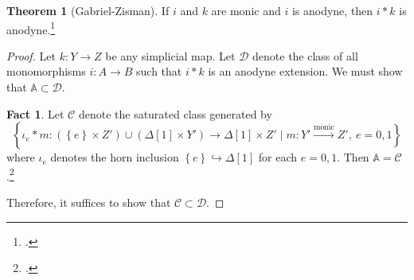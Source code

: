 \documentclass[10pt,letterpaper,cm]{nupset}
\theoremstyle{definition}
\theoremstyle{theorem}
\newtheorem{theorem}[definition]{Theorem}
\newtheorem*{fact}{Fact}
\theoremstyle{remark}
\newcommand{\D}{\mathcal D}
\newcommand{\0}{\mathbf{0}}
\newcommand{\1}{\mathbf{1}}
\newcommand{\2}{\mathbf{2}}
\begin{document}
\begin{theorem}[Gabriel-Zisman]
If $i$ and $k$ are monic and $i$ is anodyne, then $i \mathbin{\ast} k$ is anodyne.\footnote{\cite[Theorem 3.2.2]{Joyal}.}
\end{theorem}
\begin{proof}
Let $k : Y \to Z$ be any simplicial map. Let $\D$ denote the class of all monomorphisms $i: A \to B$ such that $i\mathbin{\ast}k$ is an anodyne extension. We must show that $\mathbb{A} \subset \D$.
\begin{fact}
Let $\mathcal{C}$ denote the saturated class generated by 
\[
\left\{ {\iota_e}\mathbin{\ast}{m} : \left(\left\{e\right\}\times Z'\right) \cup \left(\Delta[1] \times Y'\right) \to \Delta[1] \times Z'\mid m : Y' \xrightarrow{\text{monic}} Z', \ e=0,1   \right\}
\] where $\iota_e$ denotes the horn inclusion  $\left\{e\right\}\hookrightarrow \Delta[1]$ for each $e=0,1$. Then $\mathbb{A} = \mathcal{C}$.\footnote{\cite[Theorem 3.2.3]{Joyal}.}
\end{fact}
Therefore, it suffices to show that $\mathcal{C}\subset \D$.

\medskip


\end{proof}
\end{document}
